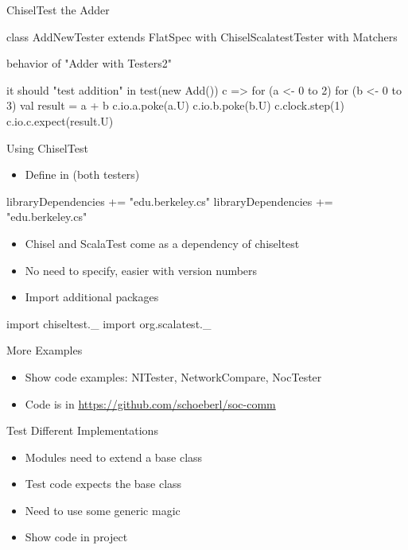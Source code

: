 \begin{frame}[fragile]{ChiselTest the Adder}
\begin{chisel}
class AddNewTester extends FlatSpec with ChiselScalatestTester with Matchers {

  behavior of "Adder with Testers2"

  it should "test addition" in {
    test(new Add()) { c =>
      for (a <- 0 to 2) {
        for (b <- 0 to 3) {
          val result = a + b
          c.io.a.poke(a.U)
          c.io.b.poke(b.U)
          c.clock.step(1)
          c.io.c.expect(result.U)
        }
      }
    }
  }
}
\end{chisel}
\end{frame}


\begin{frame}[fragile]{Using ChiselTest}
\begin{itemize}
\item Define in  (both testers)
\end{itemize}
\begin{chisel}
libraryDependencies += "edu.berkeley.cs" %
libraryDependencies += "edu.berkeley.cs" %
\end{chisel}
\begin{itemize}
\item Chisel and ScalaTest come as a dependency of chiseltest
\item No need to specify, easier with version numbers
\item Import additional packages
\end{itemize}
\begin{chisel}
import chiseltest._
import org.scalatest._
\end{chisel}
\end{frame}

\begin{frame}[fragile]{More Examples}
\begin{itemize}
\item Show code examples: NITester, NetworkCompare, NocTester
\item Code is in \url{https://github.com/schoeberl/soc-comm}
\end{itemize}
\end{frame}

\begin{frame}[fragile]{Test Different Implementations}
\begin{itemize}
\item Modules need to extend a base class
\item Test code expects the base class
\item Need to use some generic magic
\item Show code in  project
\end{itemize}
\end{frame}

